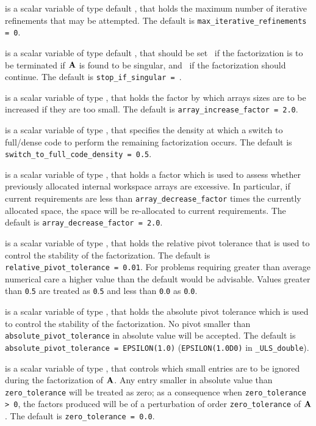 \documentclass{galahad}
\newcommand{\packagename}{ULS}
\newcommand{\fullpackagename}{\libraryname\_\-\packagename}
\begin{document}
\begin{description}
 is a scalar variable of type default
\integer, that holds
the maximum number of iterative refinements that may be attempted.
The default is {\tt max\_iterative\_refinements = 0}.

 is a scalar variable of type default
\logical, that should be set \true\ if the factorization is
to be terminated if ${\mathbf{A}}$ is found to be singular, and
\false\ if the factorization should continue.
The default is {\tt stop\_if\_singular = \false}.

 is a scalar variable of type \realdp, that holds
the factor by which arrays sizes are to be increased if they are too small.
The default is {\tt array\_increase\_factor = 2.0}.

 is a scalar variable of type \realdp,
that specifies the density at which a switch to full/dense code
to perform the remaining factorization occurs.
The default is {\tt switch\_to\_full\_code\_density = 0.5}.

 is a scalar variable of type \realdp, that holds
a factor which is used to assess whether previously allocated internal
workspace arrays are excessive. In particular, if current requirements are
less than {\tt array\_decrease\_factor} times the currently allocated space,
the space will be re-allocated to current requirements.
The default is {\tt array\_decrease\_factor = 2.0}.

 is a scalar variable of type \realdp,
that holds the relative pivot tolerance that is used to control the
stability of the factorization.
The default is {\tt relative\_pivot\-\_tolerance = 0.01}.
For problems requiring greater
than average numerical care a higher value than the default would be
advisable. Values greater than {\tt 0}.{\tt 5} are treated as {\tt 0}.{\tt 5}
and less than {\tt 0}.{\tt 0} as {\tt 0}.{\tt 0}.

 is a scalar variable of type \realdp, that
holds the absolute pivot tolerance which is used to control the
stability of the factorization.
No pivot smaller than {\tt absolute\_pivot\_tolerance} in
absolute value will be accepted.
The default is {\tt absolute\_pivot\_\-tolerance = EPSILON(1.0)}
({\tt EPSILON(1.0D0)} in {\tt \fullpackagename\_double}).

 is a scalar variable of type \realdp, that
controls which small entries are to be ignored during the factorization
of ${\mathbf{A}}$. Any entry smaller in absolute value than
{\tt zero\_\-tolerance} will be treated as zero; as a consequence when
{\tt zero\_tolerance > 0}, the factors produced will be of a perturbation
of order {\tt zero\_tolerance} of ${\mathbf{A}}$.
The default is {\tt zero\_tolerance = 0.0}.


\end{description}
\end{document}
